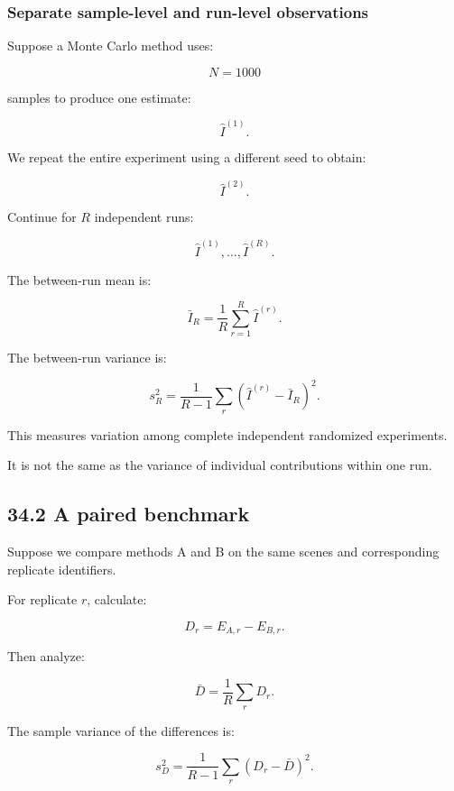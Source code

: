 \subsubsection{Separate sample-level and run-level observations}\label{02-foundations-ii-ch031-separate-sample-level-and-run-level-observations}

\hypertarget{02-foundations-ii-ch031-separate-sample-level-and-run-level-observations}{}

Suppose a Monte Carlo method uses:

\[ N=1000 \]

samples to produce one estimate:

\[ \widehat I^{(1)}. \]

We repeat the entire experiment using a different seed to obtain:

\[ \widehat I^{(2)}. \]

Continue for \(R\) independent runs:

\[ \widehat I^{(1)},\ldots,\widehat I^{(R)}. \]

The between-run mean is:

\[ \bar I_R= \frac1R\sum_{r=1}^{R}\widehat I^{(r)}. \]

The between-run variance is:

\[ s_R^2= \frac1{R-1} \sum_r(\widehat I^{(r)}-\bar I_R)^2. \]

This measures variation among complete independent randomized experiments.

It is not the same as the variance of individual contributions within one run.

\subsection{34.2 A paired benchmark}\label{02-foundations-ii-ch031-a-paired-benchmark}

\hypertarget{02-foundations-ii-ch031-a-paired-benchmark}{}

Suppose we compare methods A and B on the same scenes and corresponding replicate identifiers.

For replicate \(r\), calculate:

\[ D_r=E_{A,r}-E_{B,r}. \]

Then analyze:

\[ \bar D= \frac1R\sum_rD_r. \]

The sample variance of the differences is:

\[ s_D^2= \frac1{R-1}\sum_r(D_r-\bar D)^2. \]

